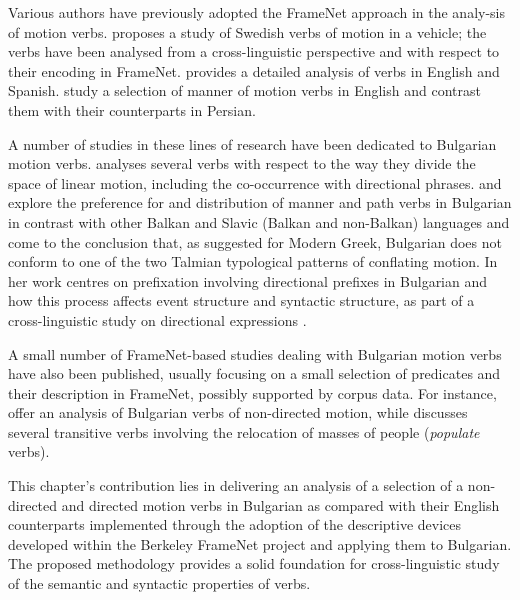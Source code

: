 \documentclass[output=paper,colorlinks,citecolor=brown]{langscibook}
\begin{document}
Various authors have previously adopted the FrameNet approach in the analy-\newline sis of motion verbs. \citet{Viberg2008} proposes a study of Swedish verbs of motion in a vehicle; the verbs have been analysed from a cross-linguistic perspective and with respect to their encoding in FrameNet. \citet{Cristobal2010} provides a detailed analysis of  verbs in English and Spanish. \citet{Imani2020} study a selection of manner of motion verbs in English and contrast them with their counterparts in Persian. 

A number of studies in these lines of research have been dedicated to Bulgarian motion verbs. \citet{tchizmarova:2015} analyses several verbs with respect to the way they divide the space of linear motion, including the co-occurrence with directional phrases. %
\citet{Lindsey2011} and \citet{speed:2015} explore the preference for and distribution of manner and path verbs in Bulgarian in contrast with other Balkan and Slavic (Balkan and non-Balkan) languages and come to the conclusion that, as suggested for Modern Greek, Bulgarian does not conform to one of the two Talmian typological patterns of conflating motion. In her work \citet{Pantcheva-2007,Pantcheva2007} centres on prefixation involving directional prefixes in Bulgarian and how this process affects event structure and syntactic structure, as part of a cross-linguistic study on directional expressions \citep{Pantcheva2011}.

A small number of FrameNet-based studies dealing with Bulgarian motion verbs have also been published, usually focusing on a small selection of predicates and their description in FrameNet, possibly supported by corpus data. For instance, \citet{2010-Formal-Description-of-Som} offer an analysis of Bulgarian verbs of non-directed motion, while
\citet{nestorova:2009} discusses several transitive verbs involving the relocation of masses of people (\textit{populate} verbs).

This chapter's contribution lies in delivering an analysis of a selection of a non-directed and directed motion verbs in Bulgarian as compared with their English counterparts implemented through the adoption of the descriptive devices developed within the Berkeley FrameNet project and applying them to Bulgarian. The proposed methodology provides a solid foundation for cross-linguistic study of the semantic and syntactic properties of verbs.
\end{document}
